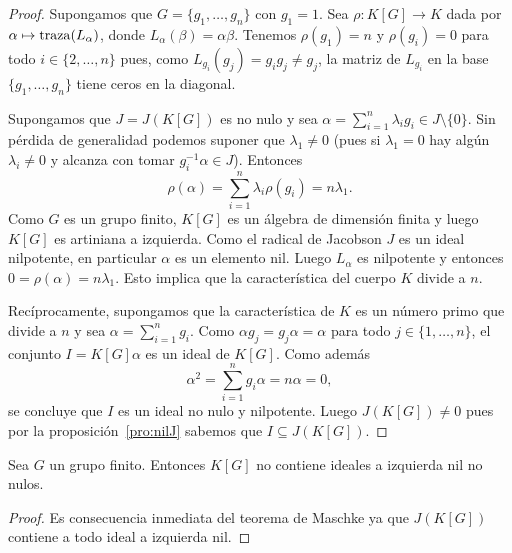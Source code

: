 \begin{exercise}
\begin{proof}
	Supongamos que $G=\{g_1,\dots,g_n\}$ con $g_1=1$. Sea $\rho\colon K[G]\to
	K$ dada por $\alpha\mapsto\operatorname{traza}(L_{\alpha})$, donde
	$L_{\alpha}(\beta)=\alpha\beta$. Tenemos $\rho(g_1)=n$ y $\rho(g_i)=0$ para
	todo $i\in\{2,\dots,n\}$ pues,  como $L_{g_i}(g_j)=g_{i}g_j\ne g_j$, la
	matriz de $L_{g_i}$ en la base $\{g_1,\dots,g_n\}$ tiene ceros en la
	diagonal.

	Supongamos que $J=J(K[G])$ es no nulo y sea
	$\alpha=\sum_{i=1}^n\lambda_ig_i\in J\setminus\{0\}$. Sin pérdida de
	generalidad podemos suponer que $\lambda_1\ne 0$ (pues si $\lambda_1=0$ hay
	algún $\lambda_i\ne 0$ y alcanza con tomar $g_i^{-1}\alpha\in J$). Entonces
	\[
		\rho(\alpha)=\sum_{i=1}^n \lambda_i\rho(g_i)=n\lambda_1.
	\]
	Como $G$ es un grupo finito, $K[G]$ es un álgebra de dimensión finita y
	luego $K[G]$ es artiniana a izquierda. Como el radical de Jacobson $J$ es
	un ideal nilpotente, en particular $\alpha$ es un elemento nil. Luego
	$L_{\alpha}$ es nilpotente y entonces $0=\rho(\alpha)=n\lambda_1$. Esto
	implica que la característica del cuerpo $K$ divide a $n$. 

	Recíprocamente, supongamos que la característica de $K$ es un número primo
	que divide a $n$ y sea $\alpha=\sum_{i=1}^ng_i$. Como $\alpha
	g_j=g_j\alpha=\alpha$ para todo $j\in\{1,\dots,n\}$, el conjunto
	$I=K[G]\alpha$ es un ideal de $K[G]$. Como además 
	\[
		\alpha^2=\sum_{i=1}^n g_i\alpha=n\alpha=0,
	\]
	se concluye que $I$ es un ideal no nulo y nilpotente. Luego $J(K[G])\ne 0$
	pues por la proposición~\ref{pro:nilJ} sabemos que $I\subseteq J(K[G])$.
\end{proof}

\begin{corollary}
	\label{cor:GfinitoNOnil}
	Sea $G$ un grupo finito. Entonces $K[G]$ no contiene ideales a izquierda
	nil no nulos.
\end{corollary}

\begin{proof}
	Es consecuencia inmediata del teorema de Maschke ya que $J(K[G])$ contiene a
	todo ideal a izquierda nil.	
\end{proof}


\end{exercise}
